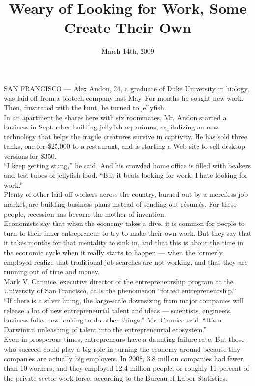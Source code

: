 \documentclass[spanish]{article}
\title{Weary of Looking for Work, Some Create Their Own}
\date{March 14th, 2009}
\begin{document}
\maketitle\thispagestyle{empty}
SAN FRANCISCO — Alex Andon, 24, a graduate of Duke University in biology,
was laid off from a biotech company last May. For months he sought new work.
Then, frustrated with the hunt, he turned to jellyfish.\\

In an apartment he shares here with six roommates, Mr. Andon started a business
in September building jellyfish aquariums, capitalizing on new technology that
helps the fragile creatures survive in captivity.
He has sold three tanks, one for \$25,000 to a restaurant, and is starting a Web
site to sell desktop versions for \$350.\\

“I keep getting stung,” he said. And his crowded home office is filled with beakers
and test tubes of jellyfish food. “But it beats looking for work. I hate looking for work.”\\

Plenty of other laid-off workers across the country, burned out by a merciless job market,
are building business plans instead of sending out résumés.
For these people, recession has become the mother of invention.\\

Economists say that when the economy takes a dive, it is common for people to turn to their
inner entrepreneur to try to make their own work. But they say that it takes months for
that mentality to sink in, and that this is about the time in the economic cycle when
it really starts to happen — when the formerly employed realize that traditional job searches
are not working, and that they are running out of time and money.\\

Mark V. Cannice, executive director of the entrepreneurship program at the University of San Francisco,
calls the phenomenon “forced entrepreneurship.”\\

“If there is a silver lining, the large-scale downsizing from major companies will release a lot
of new entrepreneurial talent and ideas — scientists, engineers, business folks now looking to do
other things,” Mr. Cannice said. “It’s a Darwinian unleashing of talent into the entrepreneurial ecosystem.”\\

Even in prosperous times, entrepreneurs have a daunting failure rate. But those who succeed could play a big
role in turning the economy around because tiny companies are actually big employers.
In 2008, 3.8 million companies had fewer than 10 workers, and they employed 12.4 million people,
or roughly 11 percent of the private sector work force, according to the Bureau of Labor Statistics.\\
\end{document}

